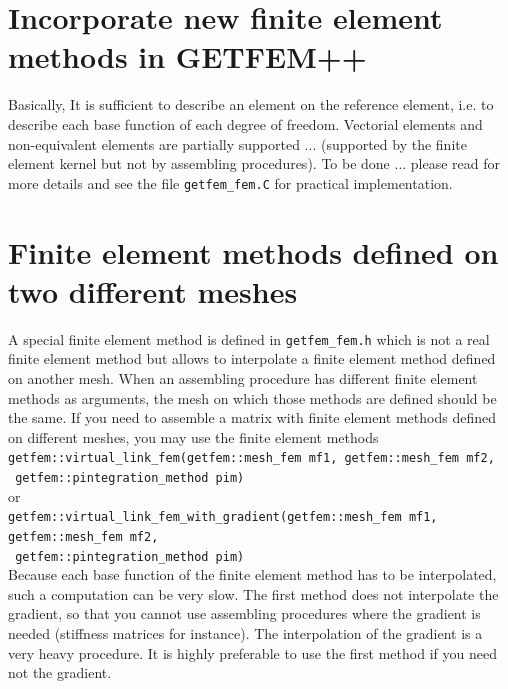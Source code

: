 \documentclass[11pt,a4paper]{article}
\begin{document}
\section{Incorporate new finite element methods in GETFEM++}

Basically, It is sufficient to describe an element on the reference element, i.e. to describe each base function of each degree of freedom. Vectorial elements and non-equivalent elements are partially supported ... (supported by the finite element kernel but not by assembling procedures). To be done ... please read \cite{BASCOMP} for more details and see the file {\tt getfem\_fem.C} for practical implementation.

\section{Finite element methods defined on two different meshes}

A special finite element method is defined in {\tt getfem\_fem.h} which is not a real finite element method but allows to interpolate a finite element method defined on another mesh. When an assembling procedure has different finite element methods as arguments, the mesh on which those methods are defined should be the same. If you need to assemble a matrix with finite element methods defined on different meshes, you may use the finite element methods\\[0.5cm]
{\tt getfem::virtual\_link\_fem(getfem::mesh\_fem mf1, getfem::mesh\_fem mf2,} \\ {\tt \mbox{}\hspace{12em} getfem::pintegration\_method pim) }\\[0.2cm]
or\\[0.2cm]
{\tt getfem::virtual\_link\_fem\_with\_gradient(getfem::mesh\_fem mf1, getfem::mesh\_fem mf2,} \\ {\tt \mbox{}\hspace{12em} getfem::pintegration\_method pim) }\\[0.5cm]
Because each base function of the finite element method has to be interpolated, such a computation can be very slow. The first method does not interpolate the gradient, so that you cannot use assembling procedures where the gradient is needed (stiffness matrices for instance). The interpolation of the gradient is a very heavy procedure. It is highly preferable to use the first method if you need not the gradient.\\[0.5cm]
\end{document}
